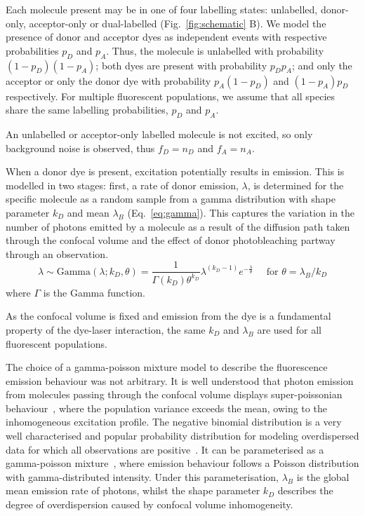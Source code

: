 Each molecule present may be in one of four labelling states: unlabelled, donor-only, acceptor-only or dual-labelled (Fig.~\ref{fig:schematic} B). We model the presence of donor and acceptor dyes as independent events with respective probabilities $p_D$ and $p_A$. Thus, the molecule is unlabelled with probability $(1-p_D)(1-p_A)$; both dyes are present with probability $p_D p_A$; and only the acceptor or only the donor dye with probability $p_A (1-p_D)$ and $(1-p_A)p_D$ respectively. For multiple fluorescent populations, we assume that all species share the same labelling probabilities, $p_D$ and $p_A$. 

An unlabelled or acceptor-only labelled molecule is not excited, so only background noise is observed, thus $f_D = n_D$ and $f_A = n_A$.

When a donor dye is present, excitation potentially results in emission. This is modelled in two stages: first, a rate of donor emission, $\lambda$, is determined for the specific molecule as a random sample from a gamma distribution with shape parameter $k_D$ and mean $\lambda_B$ (Eq.~\ref{eq:gamma}). This captures the variation in the number of photons emitted by a molecule as a result of the diffusion path taken through the confocal volume and the effect of donor photobleaching partway through an observation.
\begin{equation}
\lambda \sim \text{Gamma}(\lambda; k_D, \theta) =  \frac{1}{\Gamma(k_D) \theta^{k_D}} \lambda^{(k_D - 1)} e^{-\frac{\lambda}{\theta}} \quad\text{ for } \theta = \lambda_B / k_D
\label{eq:gamma}
\end{equation} 
where $\Gamma$ is the Gamma function. 

As the confocal volume is fixed and emission from the dye is a fundamental property of the dye-laser interaction, the same $k_D$ and $\lambda_B$ are used for all fluorescent populations. 

The choice of a gamma-poisson mixture model to describe the fluorescence emission behaviour was not arbitrary. It is well understood that photon emission from molecules passing through the confocal volume displays super-poissonian behaviour~\cite{chen99}, where the population variance exceeds the mean, owing to the inhomogeneous excitation profile. The negative binomial distribution is a very well characterised and popular probability distribution for modeling overdispersed data for which all observations are positive~\cite{lloydsmith07, bliss53}. It can be parameterised as a gamma-poisson mixture~\cite{lloydsmith07}, where emission behaviour follows a Poisson distribution with gamma-distributed intensity. Under this parameterisation, $\lambda_B$ is the global mean emission rate of photons, whilst the shape parameter $k_D$ describes the degree of overdispersion caused by confocal volume inhomogeneity.   

